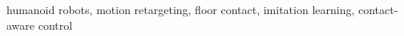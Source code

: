 \documentclass[conference]{IEEEtran}
\begin{document}
\begin{IEEEkeywords}
humanoid robots, motion retargeting, floor contact, imitation learning, contact-aware control
\end{IEEEkeywords}









\end{document}
